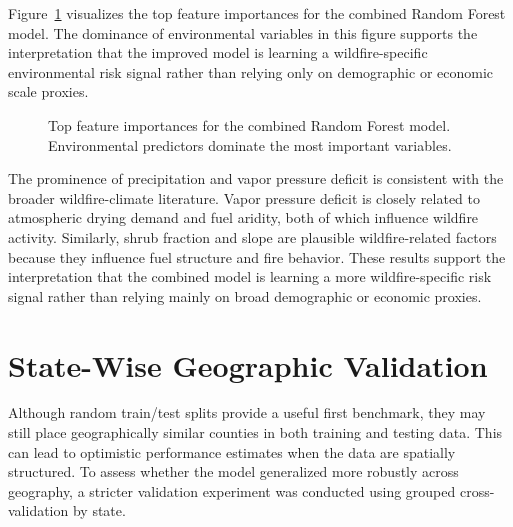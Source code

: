 \begin{table}[htbp]
    \centering
    \caption{Feature importance values for the combined Random Forest model after environmental augmentation.}
    \label{tab:combined_rf_feature_importance_export}
\end{table}

Figure~\ref{fig:combined_rf_feature_importance} visualizes the top feature importances for the combined Random Forest model. The dominance of environmental variables in this figure supports the interpretation that the improved model is learning a wildfire-specific environmental risk signal rather than relying only on demographic or economic scale proxies.

\begin{figure}[htbp]
    \centering
    \caption{Top feature importances for the combined Random Forest model. Environmental predictors dominate the most important variables.}
    \label{fig:combined_rf_feature_importance}
\end{figure}

The prominence of precipitation and vapor pressure deficit is consistent with the broader wildfire-climate literature. Vapor pressure deficit is closely related to atmospheric drying demand and fuel aridity, both of which influence wildfire activity. Similarly, shrub fraction and slope are plausible wildfire-related factors because they influence fuel structure and fire behavior. These results support the interpretation that the combined model is learning a more wildfire-specific risk signal rather than relying mainly on broad demographic or economic proxies.

\section{State-Wise Geographic Validation}

Although random train/test splits provide a useful first benchmark, they may still place geographically similar counties in both training and testing data. This can lead to optimistic performance estimates when the data are spatially structured. To assess whether the model generalized more robustly across geography, a stricter validation experiment was conducted using grouped cross-validation by state.

